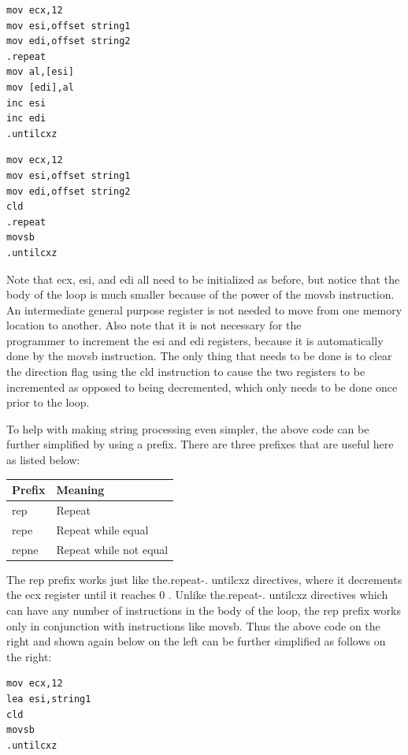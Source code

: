 \documentclass[10pt]{book}
\begin{document}
\begin{center}
\begin{center}
\begin{center}
\begin{verbatim}
mov ecx,12
mov esi,offset string1
mov edi,offset string2
.repeat
mov al,[esi]
mov [edi],al
inc esi
inc edi
.untilcxz
\end{verbatim}

\begin{verbatim}
mov ecx,12
mov esi,offset string1
mov edi,offset string2
cld
.repeat
movsb
.untilcxz
\end{verbatim}

Note that ecx, esi, and edi all need to be initialized as before, but notice that the body of the loop is much smaller because of the power of the movsb instruction. An intermediate general purpose register is not needed to move from one memory location to another. Also note that it is not necessary for the\\
programmer to increment the esi and edi registers, because it is automatically done by the movsb instruction. The only thing that needs to be done is to clear the direction flag using the cld instruction to cause the two registers to be incremented as opposed to being decremented, which only needs to be done once prior to the loop.

To help with making string processing even simpler, the above code can be further simplified by using a prefix. There are three prefixes that are useful here as listed below:

\begin{center}
\begin{tabular}{|l|l|}
\hline
Prefix & Meaning \\
\hline
rep & Repeat \\
\hline
repe & Repeat while equal \\
\hline
repne & Repeat while not equal \\
\hline
\end{tabular}
\end{center}

The rep prefix works just like the.repeat-. untilcxz directives, where it decrements the ecx register until it reaches 0 . Unlike the.repeat-. untilcxz directives which can have any number of instructions in the body of the loop, the rep prefix works only in conjunction with instructions like movsb. Thus the above code on the right and shown again below on the left can be further simplified as follows on the right:

\begin{verbatim}
mov ecx,12
lea esi,string1
cld
movsb
.untilcxz
\end{verbatim}


\end{center}
\end{center}
\end{center}
\end{document}
